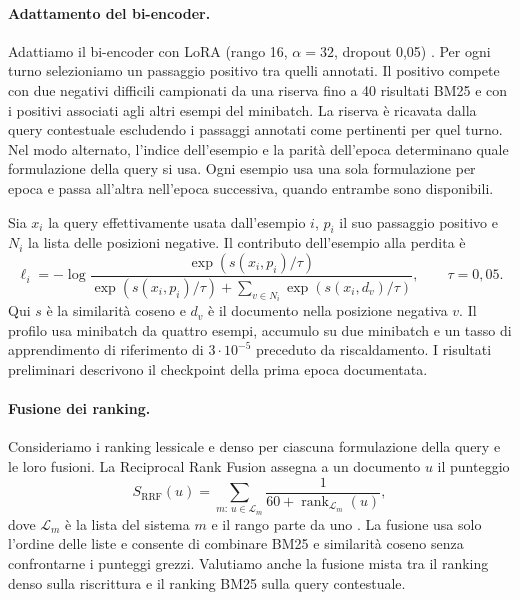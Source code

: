 \paragraph{Adattamento del bi-encoder.}
Adattiamo il bi-encoder con LoRA (rango 16, $\alpha=32$, dropout 0,05) \cite{lora}. Per ogni turno selezioniamo un passaggio positivo tra quelli annotati. Il positivo compete con due negativi difficili campionati da una riserva fino a 40 risultati BM25 e con i positivi associati agli altri esempi del minibatch. La riserva è ricavata dalla query contestuale escludendo i passaggi annotati come pertinenti per quel turno. Nel modo alternato, l'indice dell'esempio e la parità dell'epoca determinano quale formulazione della query si usa. Ogni esempio usa una sola formulazione per epoca e passa all'altra nell'epoca successiva, quando entrambe sono disponibili.

Sia $x_i$ la query effettivamente usata dall'esempio $i$, $p_i$ il suo passaggio positivo e $N_i$ la lista delle posizioni negative. Il contributo dell'esempio alla perdita è
\begin{equation}
 \ell_i=-\log
 \frac{\exp(s(x_i,p_i)/\tau)}
 {\exp(s(x_i,p_i)/\tau)+\sum_{v\in N_i}\exp(s(x_i,d_v)/\tau)},
 \qquad \tau=0{,}05.
 \label{eq:metodo-contrastiva}
\end{equation}
Qui $s$ è la similarità coseno e $d_v$ è il documento nella posizione negativa $v$. Il profilo usa minibatch da quattro esempi, accumulo su due minibatch e un tasso di apprendimento di riferimento di $3\cdot10^{-5}$ preceduto da riscaldamento. I risultati preliminari descrivono il checkpoint della prima epoca documentata.

\paragraph{Fusione dei ranking.}
Consideriamo i ranking lessicale e denso per ciascuna formulazione della query e le loro fusioni. La Reciprocal Rank Fusion assegna a un documento $u$ il punteggio
\begin{equation}
 S_{\mathrm{RRF}}(u)=
 \sum_{m:\,u\in\mathcal L_m}\frac{1}{60+\operatorname{rank}_{\mathcal L_m}(u)},
 \label{eq:metodo-rrf}
\end{equation}
dove $\mathcal L_m$ è la lista del sistema $m$ e il rango parte da uno \cite{rrf}. La fusione usa solo l'ordine delle liste e consente di combinare BM25 e similarità coseno senza confrontarne i punteggi grezzi. Valutiamo anche la fusione mista tra il ranking denso sulla riscrittura e il ranking BM25 sulla query contestuale.

